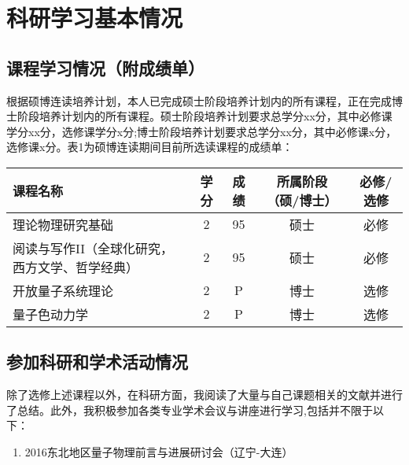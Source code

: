 ﻿%

\chapter*{\hfill 科研学习基本情况 \hfill}
\label{chap00}

\section*{课程学习情况（附成绩单）}

根据硕博连读培养计划，本人已完成硕士阶段培养计划内的所有课程，正在完成博士阶段培养计划内的所有课程。硕士阶段培养计划要求总学分xx分，其中必修课学分xx分，选修课学分x分;博士阶段培养计划要求总学分xx分，其中必修课x分，选修课x分。表1为硕博连读期间目前所选读课程的成绩单：

\begin{table}[htbp]
  \centering
  \vspace{0.2cm}
  \zhongwu
  \begin{tabular}{lcccc}
    \toprule
    课程名称 & 学分 & 成绩 & 所属阶段（硕/博士） & 必修/选修 \\
    \midrule
    理论物理研究基础                             & 2            & 95           & 硕士 & 必修\\
    阅读与写作II（全球化研究，西方文学、哲学经典） & 2             & 95         & 硕士  & 必修\\         
    开放量子系统理论 & 2            & P           & 博士& 选修\\
    量子色动力学 & 2            & P           & 博士& 选修\\
    \bottomrule
  \end{tabular}
\end{table}


\section*{参加科研和学术活动情况}
除了选修上述课程以外，在科研方面，我阅读了大量与自己课题相关的文献并进行了总结。此外，我积极参加各类专业学术会议与讲座进行学习,包括并不限于以下：
\begin{enumerate}
\item 2016东北地区量子物理前言与进展研讨会（辽宁-大连）
\end{enumerate}





